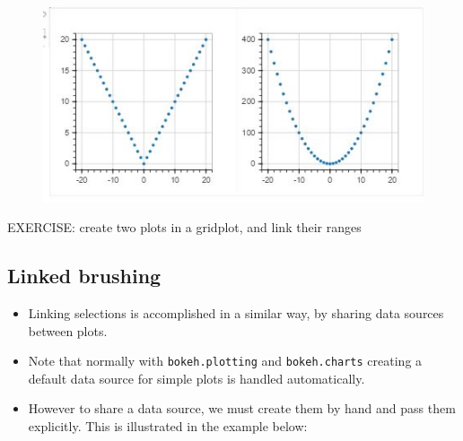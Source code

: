 \documentclass[a4paper,12pt]{article}
\begin{document}
\begin{figure}
\centering
\includegraphics[width=0.7\linewidth]{images/06-interactions-tut-03}
\end{figure}

EXERCISE: create two plots in a gridplot, and link their ranges
	


\subsection{Linked brushing}
\begin{itemize}
\item Linking selections is accomplished in a similar way, by sharing data sources between plots. 
\item Note that normally with \texttt{bokeh.plotting} and \texttt{bokeh.charts} creating a default data source for simple plots is handled automatically. 
\item However to share a data source, we must create them by hand and pass them explicitly. This is illustrated in the example below:
\end{itemize}
\end{document}
